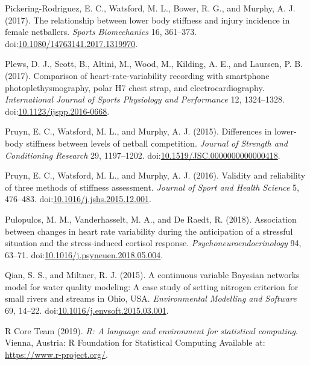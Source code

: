 \documentclass[
  english,
  man,floatsintext]{apa6}
\newlength{\cslhangindent}
\newenvironment{cslreferences}%
  {\setlength{\parindent}{0pt}%
  \everypar{\setlength{\hangindent}{\cslhangindent}}\ignorespaces}%
  {\par}
\begin{document}
\begin{cslreferences}
\leavevmode\hypertarget{ref-PickeringRodriguez2017}{}%
Pickering-Rodriguez, E. C., Watsford, M. L., Bower, R. G., and Murphy, A. J. (2017). The relationship between lower body stiffness and injury incidence in female netballers. \emph{Sports Biomechanics} 16, 361--373. doi:\href{https://doi.org/10.1080/14763141.2017.1319970}{10.1080/14763141.2017.1319970}.

\leavevmode\hypertarget{ref-Plews2017}{}%
Plews, D. J., Scott, B., Altini, M., Wood, M., Kilding, A. E., and Laursen, P. B. (2017). Comparison of heart-rate-variability recording with smartphone photoplethysmography, polar H7 chest strap, and electrocardiography. \emph{International Journal of Sports Physiology and Performance} 12, 1324--1328. doi:\href{https://doi.org/10.1123/ijspp.2016-0668}{10.1123/ijspp.2016-0668}.

\leavevmode\hypertarget{ref-Pruyn2015}{}%
Pruyn, E. C., Watsford, M. L., and Murphy, A. J. (2015). Differences in lower-body stiffness between levels of netball competition. \emph{Journal of Strength and Conditioning Research} 29, 1197--1202. doi:\href{https://doi.org/10.1519/JSC.0000000000000418}{10.1519/JSC.0000000000000418}.

\leavevmode\hypertarget{ref-Pruyn2016}{}%
Pruyn, E. C., Watsford, M. L., and Murphy, A. J. (2016). Validity and reliability of three methods of stiffness assessment. \emph{Journal of Sport and Health Science} 5, 476--483. doi:\href{https://doi.org/10.1016/j.jshs.2015.12.001}{10.1016/j.jshs.2015.12.001}.

\leavevmode\hypertarget{ref-Pulopulos2018}{}%
Pulopulos, M. M., Vanderhasselt, M. A., and De Raedt, R. (2018). Association between changes in heart rate variability during the anticipation of a stressful situation and the stress-induced cortisol response. \emph{Psychoneuroendocrinology} 94, 63--71. doi:\href{https://doi.org/10.1016/j.psyneuen.2018.05.004}{10.1016/j.psyneuen.2018.05.004}.

\leavevmode\hypertarget{ref-Qian2015}{}%
Qian, S. S., and Miltner, R. J. (2015). A continuous variable Bayesian networks model for water quality modeling: A case study of setting nitrogen criterion for small rivers and streams in Ohio, USA. \emph{Environmental Modelling and Software} 69, 14--22. doi:\href{https://doi.org/10.1016/j.envsoft.2015.03.001}{10.1016/j.envsoft.2015.03.001}.

\leavevmode\hypertarget{ref-RCoreTeam2019}{}%
R Core Team (2019). \emph{R: A language and environment for statistical computing}. Vienna, Austria: R Foundation for Statistical Computing Available at: \url{https://www.r-project.org/}.


\end{cslreferences}
\end{document}

